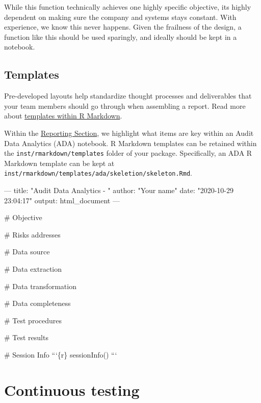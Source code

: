 \documentclass[
]{book}
\newenvironment{Shaded}{\begin{snugshade}}{\end{snugshade}}
\newcommand{\BaseNTok}[1]{\textcolor[rgb]{0.00,0.00,0.81}{#1}}
\newcommand{\FunctionTok}[1]{\textcolor[rgb]{0.00,0.00,0.00}{#1}}
\newcommand{\NormalTok}[1]{#1}
\begin{document}
While this function technically achieves one highly specific objective, its highly dependent on making sure the company and systems stays constant. With experience, we know this never happens. Given the frailness of the design, a function like this should be used sparingly, and ideally should be kept in a notebook.

\hypertarget{templates}{%
\section{Templates}\label{templates}}

Pre-developed layouts help standardize thought processes and deliverables that your team members should go through when assembling a report. Read more about \href{https://bookdown.org/yihui/rmarkdown-cookbook/package-template.html}{templates within R Markdown}.

Within the \protect\hyperlink{report-structure}{Reporting Section}, we highlight what items are key within an Audit Data Analytics (ADA) notebook. R Markdown templates can be retained within the \texttt{inst/rmarkdown/templates} folder of your package. Specifically, an ADA R Markdown template can be kept at \texttt{inst/rmarkdown/templates/ada/skeletion/skeleton.Rmd}.

\begin{Shaded}
\begin{Highlighting}[]
\NormalTok{---}
\NormalTok{title: "Audit Data Analytics - "}
\NormalTok{author: "Your name"}
\NormalTok{date: "2020-10-29 23:04:17"}
\NormalTok{output:}
\NormalTok{  html_document}
\NormalTok{---}

\FunctionTok{# Objective}

\FunctionTok{# Risks addresses}

\FunctionTok{# Data source}

\FunctionTok{# Data extraction}

\FunctionTok{# Data transformation}

\FunctionTok{# Data completeness}

\FunctionTok{# Test procedures}

\FunctionTok{# Test results}

\FunctionTok{# Session Info}
\BaseNTok{```\{r\}}
\BaseNTok{sessionInfo()}
\BaseNTok{```}
\end{Highlighting}
\end{Shaded}

\hypertarget{continuous-testing}{%
\chapter{Continuous testing}\label{continuous-testing}}
\end{document}

